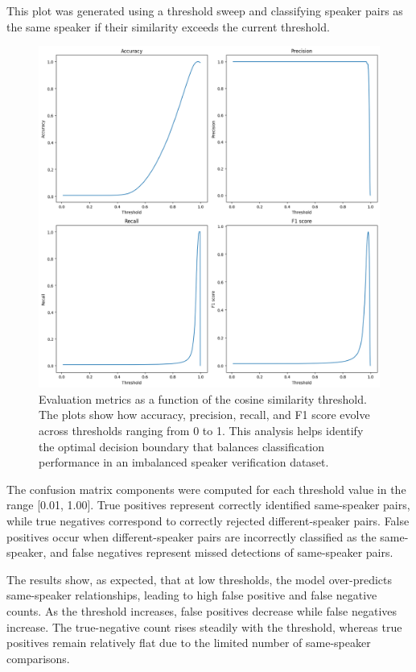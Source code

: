 \documentclass[conference]{IEEEtran}
\begin{document}
	This plot was generated using a threshold sweep and classifying speaker pairs as the same speaker if their similarity exceeds the current threshold.
	
	\begin{figure}[H]
		\centering
		\includegraphics[width=1\linewidth]{img/img-metrics}
		\caption{Evaluation metrics as a function of the cosine similarity threshold. The plots show how accuracy, precision, recall, and F1 score evolve across thresholds ranging from 0 to 1. This analysis helps identify the optimal decision boundary that balances classification performance in an imbalanced speaker verification dataset.}
		\label{fig:img-metrics}
	\end{figure}
	
	The confusion matrix components were computed for each threshold value in the range [0.01, 1.00]. True positives represent correctly identified same-speaker pairs, while true negatives correspond to correctly rejected different-speaker pairs. False positives occur when different-speaker pairs are incorrectly classified as the same-speaker, and false negatives represent missed detections of same-speaker pairs.
	
	The results show, as expected, that at low thresholds, the model over-predicts same-speaker relationships, leading to high false positive and false negative counts. As the threshold increases, false positives decrease while false negatives increase. The true-negative count rises steadily with the threshold, whereas true positives remain relatively flat due to the limited number of same-speaker comparisons.
	
\end{document}
